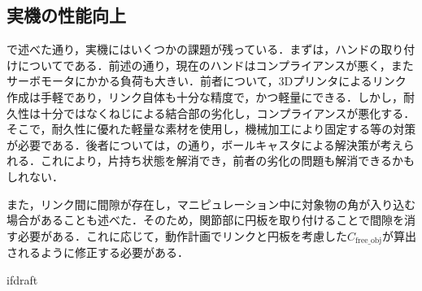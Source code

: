 \documentclass[a4paper,twoside,12pt,papersize, dvipdfmx]{iirthesis}
\begin{document}
\subsection*{実機の性能向上}
で述べた通り，実機にはいくつかの課題が残っている．まずは，ハンドの取り付けについてである．前述の通り，現在のハンドはコンプライアンスが悪く，またサーボモータにかかる負荷も大きい．前者について，3Dプリンタによるリンク作成は手軽であり，リンク自体も十分な精度で，かつ軽量にできる．しかし，耐久性は十分ではなくねじによる結合部の劣化し，コンプライアンスが悪化する．そこで，耐久性に優れた軽量な素材を使用し，機械加工により固定する等の対策が必要である．後者については，の通り，ボールキャスタによる解決策が考えられる．これにより，片持ち状態を解消でき，前者の劣化の問題も解消できるかもしれない．\par
また，リンク間に間隙が存在し，マニピュレーション中に対象物の角が入り込む場合があることも述べた．そのため，関節部に円板を取り付けることで間隙を消す必要がある．これに応じて，動作計画でリンクと円板を考慮した$C_{\mathrm {free\_obj}}$が算出されるように修正する必要がある．


\expandafter\ifx\csname ifdraft\endcsname\relax
    
\end{document}
